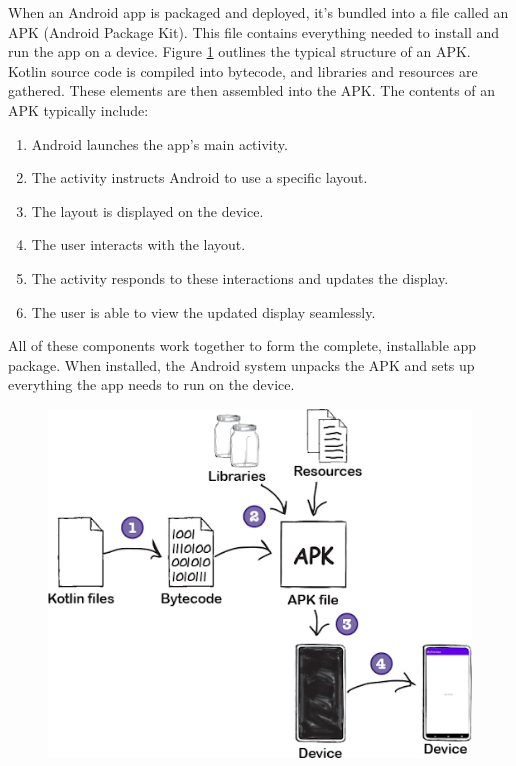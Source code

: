 When an Android app is packaged and deployed, it’s bundled into a file called an APK (Android Package Kit). This file contains everything needed to install and run the app on a device. Figure \ref{fig:apktoapp} outlines the typical structure of an APK.
Kotlin source code is compiled into bytecode, and libraries and resources are gathered. These elements are then assembled into the APK. The contents of an APK typically include:
\begin{enumerate}
	\item Android launches the app’s main activity.
	\item The activity instructs Android to use a specific layout.
	\item The layout is displayed on the device.
	\item The user interacts with the layout.
	\item The activity responds to these interactions and updates the display.
	\item The user is able to view the updated display seamlessly.
\end{enumerate}

All of these components work together to form the complete, installable app package. When installed, the Android system unpacks the APK and sets up everything the app needs to run on the device.
\begin{figure}[H]
	\centering
	\includegraphics[scale=.65]{apk_to_app.png}
	\caption{}
	\label{fig:apktoapp}
\end{figure}


